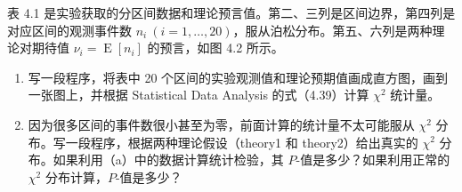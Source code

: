\begin{question}
表 4.1
是实验获取的分区间数据和理论预言值。第二、三列是区间边界，第四列是对应区间的观测事件数
\(n_i\ (i=1,\ldots,20)\)，服从泊松分布。第五、六列是两种理论对期待值
\(\nu_i=\operatorname{E}[n_i]\) 的预言，如图 4.2 所示。

\begin{enumerate}
\item 写一段程序，将表中 20
个区间的实验观测值和理论预期值画成直方图，画到一张图上，并根据
Statistical Data Analysis 的式（4.39）计算 \(\chi^2\) 统计量。

\item 因为很多区间的事件数很小甚至为零，前面计算的统计量不太可能服从
\(\chi^2\) 分布。写一段程序，根据两种理论假设（theory1 和
theory2）给出真实的 \(\chi^2\)
分布。如果利用（a）中的数据计算统计检验，其
\(P\)-值是多少？如果利用正常的 \(\chi^2\) 分布计算，\(P\)-值是多少？


\end{enumerate}
\end{question}
